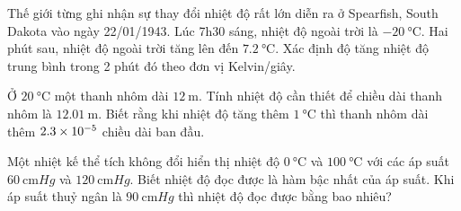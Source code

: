 \begin{ex}
	Thế giới từng ghi nhận sự thay đổi nhiệt độ rất lớn diễn ra ở Spearfish, South Dakota vào ngày 22/01/1943. Lúc 7h30 sáng, nhiệt độ ngoài trời là $\SI{-20}{\celsius}$. Hai phút sau, nhiệt độ ngoài trời tăng lên đến $\SI{7.2}{\celsius}$. Xác định độ tăng nhiệt độ trung bình trong 2 phút đó theo đơn vị Kelvin/giây.
	\end{ex}
\begin{ex}
Ở $\SI{20}{\celsius}$ một thanh nhôm dài $\SI{12}{\meter}$. Tính nhiệt độ cần thiết để chiều dài thanh nhôm là $\SI{12.01}{\meter}$. Biết rằng khi nhiệt độ tăng thêm $\SI{1}{\celsius}$ thì thanh nhôm dài thêm $\SI{2.3E-5}{}$ chiều dài ban đầu.
\end{ex}


\begin{ex}
Một nhiệt kế thể tích không đổi hiển thị nhiệt độ $\SI{0}{\celsius}$ và $\SI{100}{\celsius}$ với các áp suất $\SI{60}{\centi\meter Hg}$ và $\SI{120}{\centi\meter Hg}$. Biết nhiệt độ đọc được là hàm bậc nhất của áp suất. Khi áp suất thuỷ ngân là $\SI{90}{\centi\meter Hg}$ thì nhiệt độ đọc được bằng bao nhiêu?

\end{ex}



